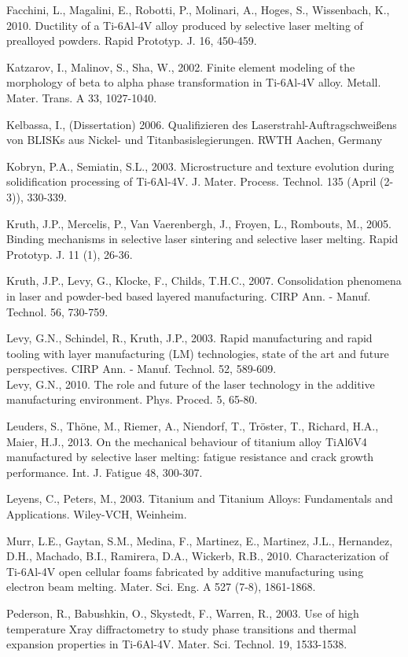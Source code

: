 \documentclass[10pt]{article}
\begin{document}
Facchini, L., Magalini, E., Robotti, P., Molinari, A., Hoges, S., Wissenbach, K., 2010. Ductility of a Ti-6Al-4V alloy produced by selective laser melting of prealloyed powders. Rapid Prototyp. J. 16, 450-459.

Katzarov, I., Malinov, S., Sha, W., 2002. Finite element modeling of the morphology of beta to alpha phase transformation in Ti-6Al-4V alloy. Metall. Mater. Trans. A 33, 1027-1040.

Kelbassa, I., (Dissertation) 2006. Qualifizieren des Laserstrahl-Auftragschweißens von BLISKs aus Nickel- und Titanbasislegierungen. RWTH Aachen, Germany

Kobryn, P.A., Semiatin, S.L., 2003. Microstructure and texture evolution during solidification processing of Ti-6Al-4V. J. Mater. Process. Technol. 135 (April (2-3)), 330-339.

Kruth, J.P., Mercelis, P., Van Vaerenbergh, J., Froyen, L., Rombouts, M., 2005. Binding mechanisms in selective laser sintering and selective laser melting. Rapid Prototyp. J. 11 (1), 26-36.

Kruth, J.P., Levy, G., Klocke, F., Childs, T.H.C., 2007. Consolidation phenomena in laser and powder-bed based layered manufacturing. CIRP Ann. - Manuf. Technol. 56, 730-759.

Levy, G.N., Schindel, R., Kruth, J.P., 2003. Rapid manufacturing and rapid tooling with layer manufacturing (LM) technologies, state of the art and future perspectives. CIRP Ann. - Manuf. Technol. 52, 589-609.\\
Levy, G.N., 2010. The role and future of the laser technology in the additive manufacturing environment. Phys. Proced. 5, 65-80.

Leuders, S., Thöne, M., Riemer, A., Niendorf, T., Tröster, T., Richard, H.A., Maier, H.J., 2013. On the mechanical behaviour of titanium alloy TiAl6V4 manufactured by selective laser melting: fatigue resistance and crack growth performance. Int. J. Fatigue 48, 300-307.

Leyens, C., Peters, M., 2003. Titanium and Titanium Alloys: Fundamentals and Applications. Wiley-VCH, Weinheim.

Murr, L.E., Gaytan, S.M., Medina, F., Martinez, E., Martinez, J.L., Hernandez, D.H., Machado, B.I., Ramirera, D.A., Wickerb, R.B., 2010. Characterization of Ti-6Al-4V open cellular foams fabricated by additive manufacturing using electron beam melting. Mater. Sci. Eng. A 527 (7-8), 1861-1868.

Pederson, R., Babushkin, O., Skystedt, F., Warren, R., 2003. Use of high temperature Xray diffractometry to study phase transitions and thermal expansion properties in Ti-6Al-4V. Mater. Sci. Technol. 19, 1533-1538.
\end{document}
